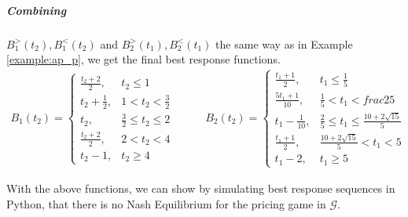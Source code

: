 \documentclass[10pt,a4paper]{book}
\newcommand{\Gm}{\mathcal{G}}
\theoremstyle{definition}
\theoremstyle{comment}
\begin{document}
\subparagraph{Combining} $B_1^>(t_2), B_1^<(t_2)$ and $B_2^>(t_1), B_2^<(t_1)$ the same way as in Example \ref{example:ap_p}, we get the final best response functions.
\begin{equation*}
	\begin{aligned}
		B_1(t_2) =
		\begin{cases}
			\frac{t_2 + 2}2, & t_2 \le 1 \\
			t_2 + \frac12, & 1 < t_2 < \frac32 \\
			t_2, & \frac32 \le t_2 \le 2 \\
			\frac{t_2 + 2}2, & 2 < t_2 < 4 \\
			t_2 - 1, & t_2 \ge 4
		\end{cases}
	\end{aligned}
	\qquad
	\begin{aligned}
		B_2(t_2) =
		\begin{cases}
			\frac{t_1 + 1}2, & t_1 \le \frac15 \\
			\frac{5 t_1 + 1}{10}, & \frac15 < t_1 < frac25 \\
			t_1 - \frac1{10}, & \frac25 \le t_1 \le \frac{10 + 2 \sqrt{15}}5 \\
			\frac{t_1 + 1}2, & \frac{10 + 2 \sqrt{15}}5 < t_1 < 5 \\
			t_1 - 2, & t_1 \ge 5
		\end{cases}
	\end{aligned}
\end{equation*}

With the above functions, we can show by simulating best response sequences in Python, that there is no Nash Equilibrium for the pricing game in $\Gm$.
\end{document}
